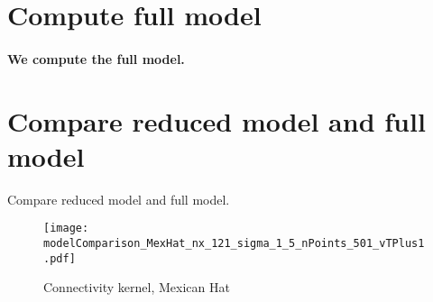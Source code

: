 \documentclass[a4paper, 12pt, english]{article}
\begin{document}
\newpage





\section{Compute full model}
\paragraph{We compute the full model.}

\newpage


\section{Compare reduced model and full model}
Compare reduced model and full model.
\begin{figure}
\centering
\texttt{[image: modelComparison\_MexHat\_nx\_121\_sigma\_1\_5\_nPoints\_501\_vTPlus1.pdf]}
\caption{Connectivity kernel, Mexican Hat}
\end{figure}
\end{document}
